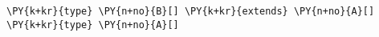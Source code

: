 \begin{Verbatim}[commandchars=\\\{\}]
\PY{k+kr}{type} \PY{n+no}{B}[] \PY{k+kr}{extends} \PY{n+no}{A}[]
\PY{k+kr}{type} \PY{n+no}{A}[]
\end{Verbatim}
